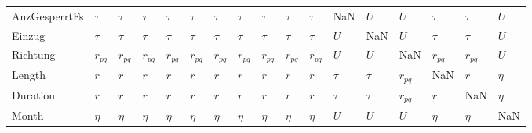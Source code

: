 \begin{tabular}{lllllllllllllllll}
AnzGesperrtFs &    $\tau$ &    $\tau$ &    $\tau$ &    $\tau$ &    $\tau$ &    $\tau$ &    $\tau$ &    $\tau$ &    $\tau$ &    $\tau$ &           NaN &     $U$ &       $U$ &    $\tau$ &    $\tau$ &     $U$ \\
Einzug        &    $\tau$ &    $\tau$ &    $\tau$ &    $\tau$ &    $\tau$ &    $\tau$ &    $\tau$ &    $\tau$ &    $\tau$ &    $\tau$ &           $U$ &     NaN &       $U$ &    $\tau$ &    $\tau$ &     $U$ \\
Richtung      &  $r_{pq}$ &  $r_{pq}$ &  $r_{pq}$ &  $r_{pq}$ &  $r_{pq}$ &  $r_{pq}$ &  $r_{pq}$ &  $r_{pq}$ &  $r_{pq}$ &  $r_{pq}$ &           $U$ &     $U$ &       NaN &  $r_{pq}$ &  $r_{pq}$ &     $U$ \\
Length        &       $r$ &       $r$ &       $r$ &       $r$ &       $r$ &       $r$ &       $r$ &       $r$ &       $r$ &       $r$ &        $\tau$ &  $\tau$ &  $r_{pq}$ &       NaN &       $r$ &  $\eta$ \\
Duration      &       $r$ &       $r$ &       $r$ &       $r$ &       $r$ &       $r$ &       $r$ &       $r$ &       $r$ &       $r$ &        $\tau$ &  $\tau$ &  $r_{pq}$ &       $r$ &       NaN &  $\eta$ \\
Month         &    $\eta$ &    $\eta$ &    $\eta$ &    $\eta$ &    $\eta$ &    $\eta$ &    $\eta$ &    $\eta$ &    $\eta$ &    $\eta$ &           $U$ &     $U$ &       $U$ &    $\eta$ &    $\eta$ &     NaN \\
\bottomrule
\end{tabular}
